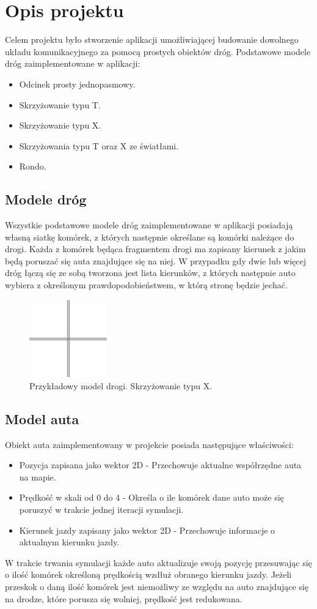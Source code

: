 \documentclass{article}
\begin{document}
\section{Opis projektu}

Celem projektu było stworzenie aplikacji umożliwiającej budowanie dowolnego układu komunikacyjnego za pomocą prostych obiektów dróg. Podstawowe modele dróg zaimplementowane w aplikacji:
\begin{itemize}
    \item Odcinek prosty jednopasmowy.
    \item Skrzyżowanie typu T.
    \item Skrzyżowanie typu X.
    \item Skrzyżowania typu T oraz X ze światłami.
    \item Rondo.
\end{itemize}
\subsection{Modele dróg}
Wszystkie podstawowe modele dróg zaimplementowane w aplikacji posiadają własną siatkę komórek, z których następnie określane są komórki należące do drogi. Każda z komórek będąca fragmentem drogi ma zapisany kierunek z jakim będą poruszać się auta znajdujące się na niej. W przypadku gdy dwie lub więcej dróg łączą się ze sobą tworzona jest lista kierunków, z których następnie auto wybiera z określonym prawdopodobieństwem, w którą stronę będzie jechać.
\begin{figure}[h]
    \centering
    \includegraphics[width=0.3\textwidth]{images/skrzyzowanie.png}
    \caption{Przykładowy model drogi. Skrzyżowanie typu X.}
    \label{fig:crossing}
\end{figure}
\subsection{Model auta}
Obiekt auta zaimplementowany w projekcie posiada następujące właściwości:
\begin{itemize}
    \item Pozycja zapisana jako wektor 2D - Przechowuje aktualne współrzędne auta na mapie.
    \item Prędkość w skali od 0 do 4 - Określa o ile komórek dane auto może się poruszyć w trakcie jednej iteracji symulacji.
    \item Kierunek jazdy zapisany jako wektor 2D - Przechowuje informacje o aktualnym kierunku jazdy.
\end{itemize}
W trakcie trwania symulacji każde auto aktualizuje swoją pozycję przesuwając się o ilość komórek określoną prędkością wzdłuż obranego kierunku jazdy. Jeżeli przeskok o daną ilość komórek jest niemożliwy ze względu na auto znajdujące się na drodze, które porusza się wolniej, prędkość jest redukowana.
\end{document}
